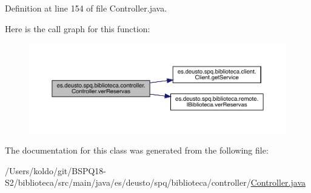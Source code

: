Definition at line 154 of file Controller.\+java.

Here is the call graph for this function\+:
\nopagebreak
\begin{figure}[H]
\begin{center}
\leavevmode
\includegraphics[width=350pt]{classes_1_1deusto_1_1spq_1_1biblioteca_1_1controller_1_1_controller_aaf010f5a789f146044b4a68a55d8003b_cgraph}
\end{center}
\end{figure}


The documentation for this class was generated from the following file\+:\begin{DoxyCompactItemize}
\item 
/\+Users/koldo/git/\+B\+S\+P\+Q18-\/\+S2/biblioteca/src/main/java/es/deusto/spq/biblioteca/controller/\mbox{\hyperlink{_controller_8java}{Controller.\+java}}\end{DoxyCompactItemize}
